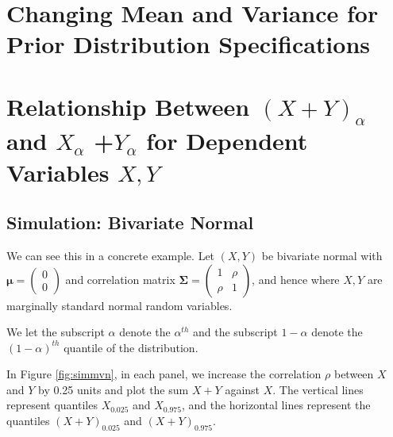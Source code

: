 \documentclass[12pt,twoside]{smiththesis}
\begin{document}
\hypertarget{changing-mean-and-variance-for-prior-distribution-specifications}{%
\section{Changing Mean and Variance for Prior Distribution Specifications}\label{changing-mean-and-variance-for-prior-distribution-specifications}}

\hypertarget{conservativeintervals}{%
\section{\texorpdfstring{Relationship Between \((X+Y)_\alpha\) and \(X_{\alpha}\) +\(Y_{\alpha}\) for Dependent Variables \(X,Y\)}{Relationship Between (X+Y)\_\textbackslash alpha and X\_\{\textbackslash alpha\} +Y\_\{\textbackslash alpha\} for Dependent Variables X,Y}}\label{conservativeintervals}}

\hypertarget{simulation-bivariate-normal}{%
\subsection{Simulation: Bivariate Normal}\label{simulation-bivariate-normal}}

We can see this in a concrete example. Let \((X,Y)\) be bivariate normal with \(\boldsymbol \mu = \begin{pmatrix} 0\\0\end{pmatrix}\) and correlation matrix \(\boldsymbol \Sigma = \begin{pmatrix} 1 & \rho \\ \rho & 1 \end{pmatrix}\), and hence where \(X, Y\) are marginally standard normal random variables.

We let the subscript \(\alpha\) denote the \(\alpha^{th}\) and the subscript \(1-\alpha\) denote the \((1-\alpha)^{th}\) quantile of the distribution.

In Figure \ref{fig:simmvn}, in each panel, we increase the correlation \(\rho\) between \(X\) and \(Y\) by 0.25 units and plot the sum \(X +Y\) against \(X\). The vertical lines represent quantiles \(X_{0.025}\) and \(X_{0.975}\), and the horizontal lines represent the quantiles \((X+Y)_{0.025}\) and \((X+Y)_{0.975}\).
\end{document}

